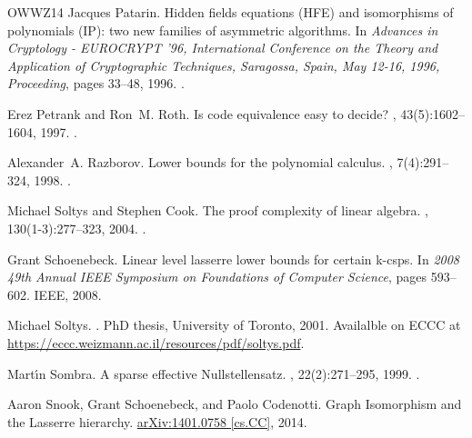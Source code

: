 \documentclass[10pt,a4paper]{article}
\theoremstyle{definition}
\begin{document}
\begin{thebibliography}{OWWZ14}
Jacques Patarin.
\newblock Hidden fields equations {(HFE)} and isomorphisms of polynomials
  {(IP):} two new families of asymmetric algorithms.
\newblock In {\em Advances in Cryptology - {EUROCRYPT} '96, International
  Conference on the Theory and Application of Cryptographic Techniques,
  Saragossa, Spain, May 12-16, 1996, Proceeding}, pages 33--48, 1996.
\newblock \href {https://doi.org/10.1007/3-540-68339-9_4}
  {}.

Erez Petrank and Ron~M. Roth.
\newblock Is code equivalence easy to decide?
, 43(5):1602--1604, 1997.
\newblock \href {https://doi.org/10.1109/18.623157}
  {}.

Alexander~A. Razborov.
\newblock Lower bounds for the polynomial calculus.
, 7(4):291--324, 1998.
\newblock \href {https://doi.org/10.1007/s000370050013}
  {}.

Michael Soltys and Stephen Cook.
\newblock The proof complexity of linear algebra.
, 130(1-3):277--323, 2004.
\newblock \href {https://doi.org/10.1016/j.apal.2003.10.018}
  {}.

Grant Schoenebeck.
\newblock Linear level lasserre lower bounds for certain k-csps.
\newblock In {\em 2008 49th Annual IEEE Symposium on Foundations of Computer
  Science}, pages 593--602. IEEE, 2008.

Michael Soltys.
.
\newblock PhD thesis, University of Toronto, 2001.
\newblock Availalble on ECCC at
  \href{https://eccc.weizmann.ac.il/resources/pdf/soltys.pdf}{https://eccc.weizmann.ac.il/resources/pdf/soltys.pdf}.

Mart\'{\i}n Sombra.
\newblock A sparse effective {N}ullstellensatz.
, 22(2):271--295, 1999.
\newblock \href {https://doi.org/10.1006/aama.1998.0633}
  {}.

Aaron Snook, Grant Schoenebeck, and Paolo Codenotti.
\newblock Graph {Isomorphism} and the {Lasserre} hierarchy.
\newblock \href{https://arxiv.org/abs/1401.0758}{arXiv:1401.0758 [cs.CC]},
  2014.


\end{thebibliography}
\end{document}
